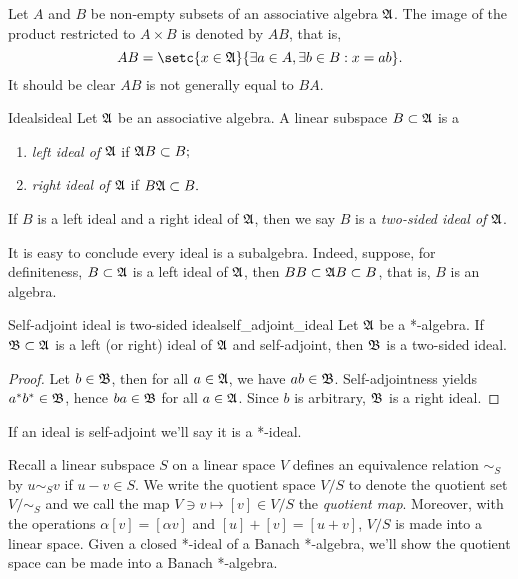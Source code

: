 Let \(A\) and \(B\) be non-empty subsets of an associative algebra \(\mathfrak{A}\). The image of the product restricted to \(A \times B\) is denoted by \(AB\), that is,
\begin{equation*}
    AB = \setc{x \in \algebra{A}}{\exists a \in A, \exists b \in B : x = ab}.
\end{equation*}
It should be clear \(AB\) is not generally equal to \(BA\).
\begin{definition}{Ideals}{ideal}
    Let \(\mathfrak{A}\) be an associative algebra. A linear subspace \(B \subset \mathfrak{A}\) is a
    \begin{enumerate}[label=(\alph*)]
        \item \emph{left ideal of \(\mathfrak{A}\)} if \(\mathfrak{A}B \subset B;\)
        \item \emph{right ideal of \(\mathfrak{A}\)} if \(B\mathfrak{A} \subset B.\)
    \end{enumerate}
    If \(B\) is a left ideal and a right ideal of \(\mathfrak{A}\), then we say \(B\) is a \emph{two-sided ideal of \(\mathfrak{A}\)}.
\end{definition}
\begin{remark}
    It is easy to conclude every ideal is a subalgebra. Indeed, suppose, for definiteness, \(B \subset \mathfrak{A}\) is a left ideal of \(\mathfrak{A}\), then \(BB \subset \mathfrak{A}B \subset B\), that is, \(B\) is an algebra.
\end{remark}
\begin{proposition}{Self-adjoint ideal is two-sided ideal}{self_adjoint_ideal}
    Let \(\mathfrak{A}\) be a *-algebra. If \(\mathfrak{B} \subset \mathfrak{A}\) is a left (or right) ideal of \(\mathfrak{A}\) and self-adjoint, then \(\mathfrak{B}\) is a two-sided ideal.
\end{proposition}
\begin{proof}
    Let \(b \in \mathfrak{B}\), then for all \(a \in \mathfrak{A}\), we have \(ab \in \mathfrak{B}\). Self-adjointness yields \(a^*b^* \in \mathfrak{B}\), hence \(ba \in \mathfrak{B}\) for all \(a \in \mathfrak{A}\). Since \(b\) is arbitrary, \(\mathfrak{B}\) is a right ideal.
\end{proof}
\begin{remark}
    If an ideal is self-adjoint we'll say it is a *-ideal.
\end{remark}

Recall a linear subspace \(S\) on a linear space \(V\) defines an equivalence relation \(\sim_S\) by \(u \sim_S v\) if \(u - v \in S\). We write the quotient space \(V/S\) to denote the quotient set \(V/\sim_S\) and we call the map \(V \ni v \mapsto [v] \in V/S\) the \emph{quotient map}. Moreover, with the operations \(\alpha[v] = [\alpha v]\) and \([u]+[v] = [u+v]\), \(V/S\) is made into a linear space. Given a closed *-ideal of a Banach *-algebra, we'll show the quotient space can be made into a Banach *-algebra.

